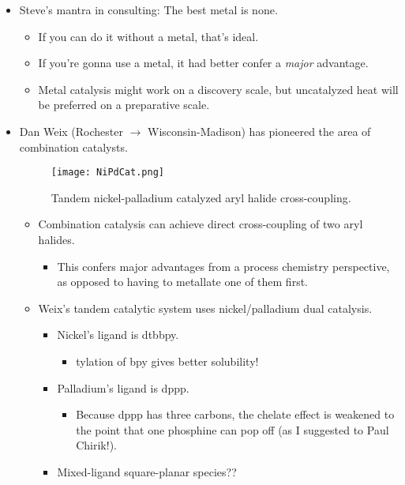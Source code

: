 \documentclass[../notes.tex]{subfiles}
\begin{document}
\begin{itemize}
    \item Steve's mantra in consulting: The best metal is none.
    \begin{itemize}
        \item If you can do it without a metal, that's ideal.
        \item If you're gonna use a metal, it had better confer a \emph{major} advantage.
        \item Metal catalysis might work on a discovery scale, but uncatalyzed heat will be preferred on a preparative scale.
    \end{itemize}
    \item Dan Weix (Rochester $\to$ Wisconsin-Madison) has pioneered the area of combination catalysts.
    \begin{figure}[h!]
        \centering
        \texttt{[image: NiPdCat.png]}
        \caption{Tandem nickel-palladium catalyzed aryl halide cross-coupling.}
        \label{fig:NiPdCat}
    \end{figure}
    \begin{itemize}
        \item Combination catalysis can achieve direct cross-coupling of two aryl halides.
        \begin{itemize}
            \item This confers major advantages from a process chemistry perspective, as opposed to having to metallate one of them first.
        \end{itemize}
        \item Weix's tandem catalytic system uses nickel/palladium dual catalysis.
        \begin{itemize}
            \item Nickel's ligand is dtbbpy.
            \begin{itemize}
                \item {}tylation of bpy gives better solubility!
            \end{itemize}
            \item Palladium's ligand is dppp.
            \begin{itemize}
                \item Because dppp has three carbons, the chelate effect is weakened to the point that one phosphine can pop off (as I suggested to Paul Chirik!).
            \end{itemize}
            \item Mixed-ligand square-planar species??

\end{itemize}
\end{itemize}
\end{itemize}
\end{document}
